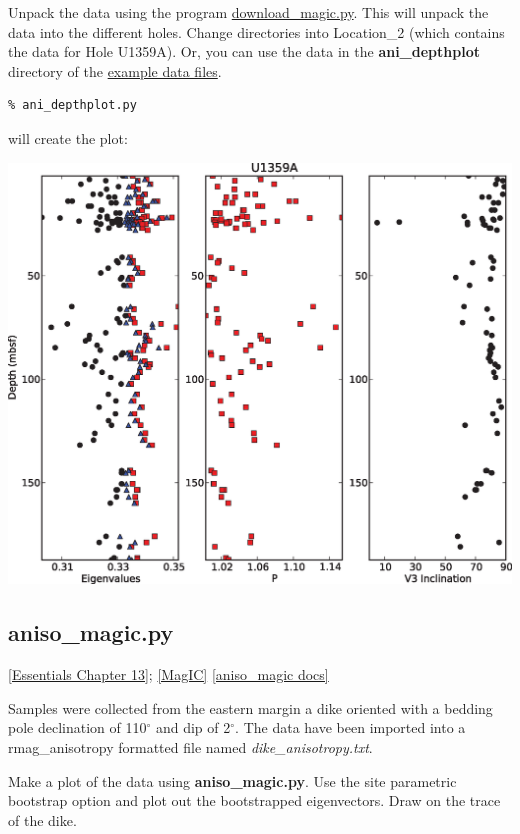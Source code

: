 \documentclass[11pt]{book}
\begin{document}
{{Unpack the data using the program \href{#download_magic.py}{download\_magic.py}.  This will unpack the data into the different holes.  Change directories into Location\_2 (which contains the data for Hole U1359A).  Or, you can use the data in the {\bf ani\_depthplot} directory of the \href{#Examples}{example data files}.


\begin{verbatim}
% ani_depthplot.py
\end{verbatim}

\noindent will create the plot:

\includegraphics[width=15cm]{EPSfiles/ani-depthplot.eps}

\subsection{aniso\_magic.py} 
\href{http://magician.ucsd.edu/Essentials_2/WebBook2ch13.html#ch13}{[Essentials Chapter 13]}; 
\href{#MagIC}{[MagIC]}
\href{http://earthref.org/PmagPy/pmagpydocs/aniso_magic-module.html}{[aniso\_magic docs]}

Samples were collected from the eastern margin a dike  oriented  with a bedding pole declination of 110$^{\circ}$ and dip of 2$^{\circ}$.      The data have been imported into a rmag\_anisotropy formatted file named {\it dike\_anisotropy.txt}.    

Make a plot of the data using {\bf aniso\_magic.py}.  Use the site parametric bootstrap option and plot out the bootstrapped eigenvectors.   Draw on the trace of the dike.   

}}
\end{document}

